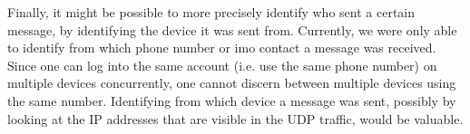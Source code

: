 \documentclass[conference]{IEEEtran}
\begin{document}
Finally, it might be possible to more precisely identify who sent a certain
message, by identifying the device it was sent from. Currently, we were only
able to identify from which phone number or imo contact a message was received.
Since one can log into the same account (i.e. use the same phone number) on
multiple devices concurrently, one cannot discern between multiple devices
using the same number. Identifying from which device a message was sent,
possibly by looking at the IP addresses that are visible in the UDP traffic,
would be valuable.


\printbibliography
\end{document}
